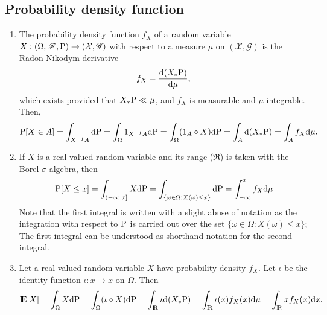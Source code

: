 \documentclass[a4paper,10pt]{article}
\begin{document}
\subsection{Probability density function}
\begin{enumerate}
 \item 
    The probability density function $f_X$ of a random variable $X:(\Omega,\mathscr{F},\mathrm{P})\to (\mathcal{X},\mathscr{G})$
    with respect to a measure $\mu$ on $(\mathcal{X},\mathscr{G})$ is the Radon-Nikodym derivative
    \[
     f_X = \frac{\mathrm{d} (X_*\mathrm{P})}{\mathrm{d} \mu},
    \]
    which exists provided that $X_*\mathrm{P} \ll \mu$, and $f_X$ is measurable and $\mu$-integrable. Then,
    \begin{align*}
     \mathrm{P}[X\in A] = \int_{X^{-1}A}\mathrm{d} \mathrm{P}
                   = \int_{\Omega} 1_{X^{-1}A}\mathrm{d}\mathrm{P}
                   = \int_{\Omega} (1_{A}\circ X)\mathrm{d}\mathrm{P}
                   = \int_{A}\mathrm{d}(X_*\mathrm{P})
                   = \int_A f_X \mathrm{d} \mu.
    \end{align*}
  \item If $X$ is a real-valued random variable and its range ($\Re$) is taken with the 
        Borel $\sigma$-algebra, then 
        \begin{align*}
         \mathrm{P}[X\leq x] = \int_{(-\infty, x]}X\mathrm{d} \mathrm{P}
         = \int_{\{\omega\in\Omega: X(\omega) \leq x\}}\mathrm{d} \mathrm{P}
         = \int_{-\infty}^x f_X\mathrm{d} \mu
        \end{align*}
        Note that the first integral is written with a slight abuse of notation as the 
        integration with respect to $\mathrm{P}$ is carried out over the set $\{\omega\in\Omega: X(\omega) \leq x\}$;
        The first integral can be understood as shorthand notation for the second integral.
  \item Let a real-valued random variable $X$ have probability density $f_X$. Let $\iota$
	be the identity function $\iota:x\mapsto x$ on $\Omega$. Then
        \[
         \E[X] = \int_\Omega X\d\prob 
               = \int_\Omega (\iota\circ X)\d\prob 
               = \int_\Re \iota\d(X_*\prob)
               = \int_\Re \iota(x) f_X(x) \d\mu
               = \int_\Re x f_X(x) \d x.
        \]

\end{enumerate}
\end{document}
